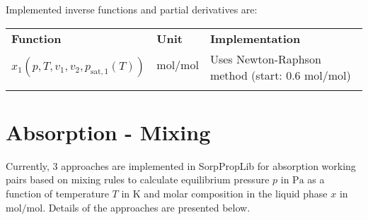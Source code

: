 %
Implemented inverse functions and partial derivatives are:
%
\begin{longtable}[l]{l|l|p{7.5cm}}
	\toprule
	\addlinespace
	\textbf{Function} & \textbf{Unit} &	\textbf{Implementation} \\
	\addlinespace
	\midrule
	\endhead
	
	\bottomrule
	\endfoot
	\bottomrule
	\endlastfoot
	\addlinespace
	
	$x_1(p,T,v_1,v_2,p_\mathrm{sat,1}(T))$& $\si{\mole\per\mole}$ & Uses Newton-Raphson method (start: 0.6 $\si{\mole\per\mole}$) \\
	
	\addlinespace
\end{longtable}
%
\section{Absorption - Mixing}
\label{cha:abs:mix}
%
Currently, 3 approaches are implemented in SorpPropLib for absorption working pairs based on mixing rules to calculate equilibrium pressure $p$ in $\si{\pascal}$ as a function of temperature $T$ in $\si{\kelvin}$ and molar composition in the liquid phase $x$ in $\si{\mole\per\mole}$. Details of the approaches are presented below.
